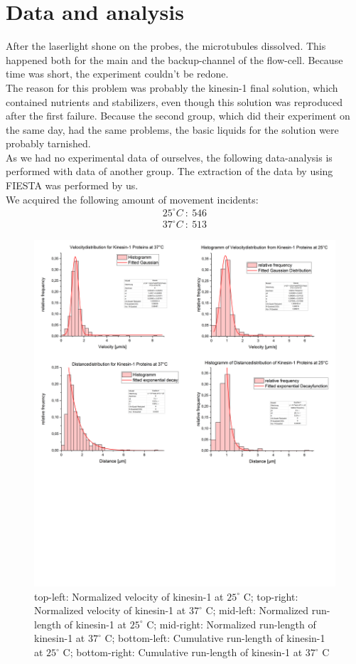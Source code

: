 \documentclass[english, %
parskip=full, %
bibliography=totoc, %
]{scrartcl}
\begin{document}
\section{Data and analysis}

After the laserlight shone on the probes, the microtubules dissolved. This happened both for the main and the backup-channel of the flow-cell. Because time was short, the experiment couldn't be redone.\\
The reason for this problem was probably the kinesin-1 final solution, which contained nutrients and stabilizers, even though this solution was reproduced after the first failure. Because the second group, which did their experiment on the same day, had the same problems, the basic liquids for the solution were probably tarnished. \\
As we had no experimental data of ourselves, the following data-analysis is performed with data of another group. The extraction of the data by using FIESTA was performed by us. \\
We acquired the following amount of movement incidents: 
\begin{align*}
25^\circ C \ : \ 546 \\
37^\circ C \ : \ 513
\end{align*}

\begin{figure}[htp] 
  \centering
     \includegraphics[width=1.0\textwidth]{all_diagrams.png}
  \caption{top-left: Normalized velocity of kinesin-1 at $25^\circ$ C; top-right: Normalized velocity of kinesin-1 at $37^\circ$ C; mid-left: Normalized run-length of kinesin-1 at $25^\circ$ C; mid-right: Normalized run-length of kinesin-1 at $37^\circ$ C; bottom-left: Cumulative run-length of kinesin-1 at $25^\circ$ C; bottom-right: Cumulative run-length of kinesin-1 at $37^\circ$ C}
  \label{fig:diagrams}
\end{figure}
\end{document}
